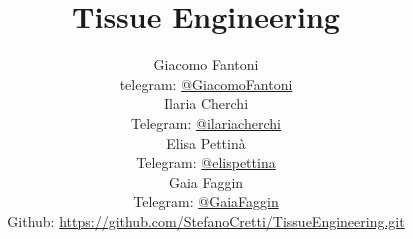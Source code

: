 
\title{\Huge\textbf{Tissue Engineering}}
\author{
  Giacomo Fantoni \\
  \small telegram: \href{https://t.me/GiacomoFantoni}{@GiacomoFantoni} \\[3pt]
  Ilaria Cherchi\\
  \small Telegram: \href{https://t.me/ilariacherchi}{@ilariacherchi} \\[3pt]
  Elisa Pettin\`a\\
  \small Telegram: \href{https://t.me/elisapettina}{@elispettina} \\[3pt]
  Gaia Faggin\\
  \small Telegram: \href{https://t.me/GaiaFaggin}{@GaiaFaggin} \\[3pt]
\small Github: \href{https://github.com/StefanoCretti/TissueEngineering.git}{https://github.com/StefanoCretti/TissueEngineering.git}}


\maketitle
\tableofcontents

    
    
    
    
    
    
    
    
    
    


